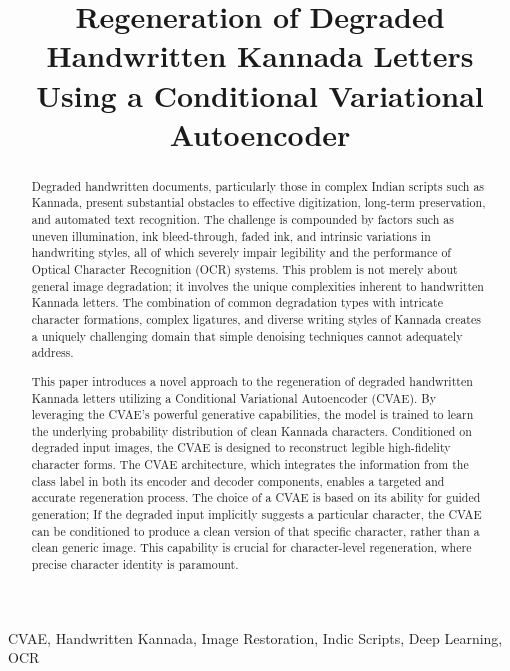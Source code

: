 \documentclass[conference]{IEEEtran}
\title{Regeneration of Degraded Handwritten Kannada Letters Using a Conditional Variational Autoencoder}
\author{\IEEEauthorblockN{Karan M}
\IEEEauthorblockA{\textit{CSE-AIML} \\
\textit{PES University}\\  Bangalore,  India \\
karanm6505@gmail.com\\
}
\and
\IEEEauthorblockN{Karanam Sumedha}
\IEEEauthorblockA{\textit{CSE} \\
\textit{PES University}\\
Bangalore, India \\}
\and
\IEEEauthorblockN{Malatesh Basavaraja Sunkada}
\IEEEauthorblockA{\textit{CSE} \\
\textit{PES University}\\
Bangalore, India\\
}
}
\begin{document}
\maketitle

\begin{abstract}
\justify
Degraded handwritten documents, particularly those in complex Indian scripts such as Kannada, present substantial obstacles to effective digitization, long-term preservation, and automated text recognition. The challenge is compounded by factors such as uneven illumination, ink bleed-through, faded ink, and intrinsic variations in handwriting styles, all of which severely impair legibility and the performance of Optical Character Recognition (OCR) systems.\cite{Davis2020, Emuru2023, Bhunia2023, Ahmed2024} This problem is not merely about general image degradation; it involves the unique complexities inherent to handwritten Kannada letters. The combination of common degradation types with intricate character formations, complex ligatures, and diverse writing styles of Kannada creates a uniquely challenging domain that simple denoising techniques cannot adequately address.

This paper introduces a novel approach to the regeneration of degraded handwritten Kannada letters utilizing a Conditional Variational Autoencoder (CVAE). By leveraging the CVAE's powerful generative capabilities, the model is trained to learn the underlying probability distribution of clean Kannada characters. Conditioned on degraded input images, the CVAE is designed to reconstruct legible high-fidelity character forms. The CVAE architecture, which integrates the information from the class label in both its encoder and decoder components, enables a targeted and accurate regeneration process.\cite{Kumar2020, Graves2013} The choice of a CVAE is based on its ability for guided generation; If the degraded input implicitly suggests a particular character, the CVAE can be conditioned to produce a clean version of that specific character, rather than a clean generic image. This capability is crucial for character-level regeneration, where precise character identity is paramount.
\end{abstract}

\begin{IEEEkeywords}
CVAE, Handwritten Kannada, Image Restoration, Indic Scripts, Deep Learning, OCR
\end{IEEEkeywords}

\maketitle
\end{document}
